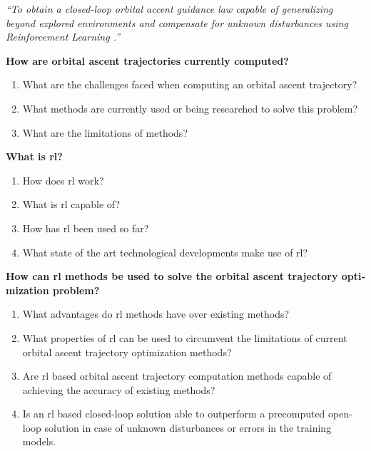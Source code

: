
\emph{“To obtain a closed-loop orbital accent guidance law capable of generalizing beyond explored environments and compensate for unknown disturbances using Reinforcement Learning .”}


\textbf{How are orbital ascent trajectories currently computed?}
\begin{enumerate}
  \item What are the challenges faced when computing an orbital ascent trajectory?
  \item What methods are currently used or being researched to solve this problem?
  \item What are the limitations of methods?
\end{enumerate}

\textbf{What is \acrlong{rl}?}
\begin{enumerate}
  \item How does \acrshort{rl} work?
  \item What is \acrshort{rl} capable of?
  \item How has \acrshort{rl} been used so far?
  \item What state of the art technological developments make use of \acrshort{rl}?
\end{enumerate}

 
\textbf{How can \acrlong{rl} methods be used to solve the orbital ascent trajectory opti­mization problem?}
\begin{enumerate}
  \item What advantages do \acrshort{rl} methods have over existing methods?
  \item What properties of \acrshort{rl} can be used to circumvent the limitations of current orbital ascent trajectory optimization methods?
  \item Are \acrshort{rl} based orbital ascent trajectory computation methods capable of achieving the accuracy of existing methods?
  \item Is an \acrshort{rl} based closed-loop solution able to outperform a precomputed open-loop solution in case of unknown disturbances or errors in the training models.
\end{enumerate}

